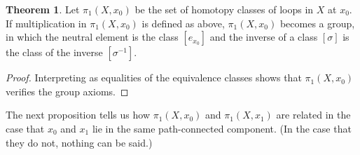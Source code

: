 \documentclass[12pt]{article}
\theoremstyle{definition}
\newtheorem{thm}{Theorem}
\numberwithin{thm}{section}
\begin{document}
\begin{thm}
	Let $\pi_1(X, x_0)$ be the set of homotopy classes of loops in $X$ at $x_0.$\\
	If multiplication in $\pi_1(X, x_0)$ is defined as above, $\pi_1(X, x_0)$ becomes a group, in which the neutral element is the class $[e_{x_0}]$ and the inverse of a class $[\sigma]$ is the class of the inverse $[\sigma^{-1}].$
\end{thm}
\begin{proof} 
	Interpreting  as equalities of the equivalence classes shows that $\pi_1(X, x_0)$ verifies the group axioms.
\end{proof}

The next proposition tells us how $\pi_1(X, x_0)$ and $\pi_1(X, x_1)$ are related in the case that $x_0$ and $x_1$ lie in the same path-connected component. (In the case that they do not, nothing can be said.)
\end{document}

